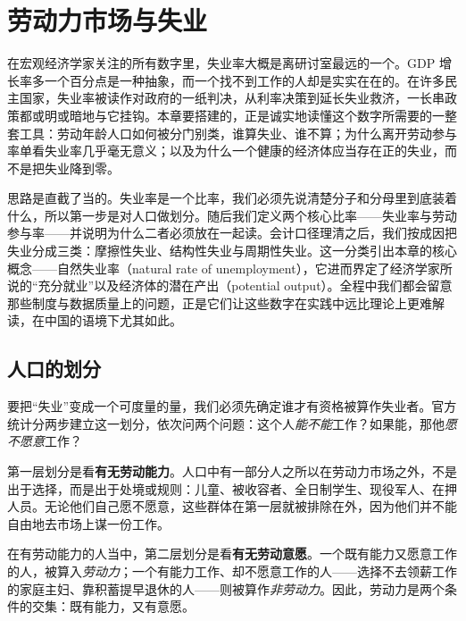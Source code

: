 \chapter{劳动力市场与失业}
\label{ch:labor}

在宏观经济学家关注的所有数字里，失业率大概是离研讨室最远的一个。GDP 增长率多一个百分点是一种抽象，而一个找不到工作的人却是实实在在的。在许多民主国家，失业率被读作对政府的一纸判决，从利率决策到延长失业救济，一长串政策都或明或暗地与它挂钩。本章要搭建的，正是诚实地读懂这个数字所需要的一整套工具：劳动年龄人口如何被分门别类，谁算失业、谁不算；为什么离开劳动参与率单看失业率几乎毫无意义；以及为什么一个健康的经济体应当存在正的失业，而不是把失业降到零。

思路是直截了当的。失业率是一个比率，我们必须先说清楚分子和分母里到底装着什么，所以第一步是对人口做划分。随后我们定义两个核心比率——失业率与劳动参与率——并说明为什么二者必须放在一起读。会计口径理清之后，我们按成因把失业分成三类：摩擦性失业、结构性失业与周期性失业。这一分类引出本章的核心概念——自然失业率（natural rate of unemployment），它进而界定了经济学家所说的“充分就业”以及经济体的潜在产出（potential output）。全程中我们都会留意那些制度与数据质量上的问题，正是它们让这些数字在实践中远比理论上更难解读，在中国的语境下尤其如此。

\section{人口的划分}

要把“失业”变成一个可度量的量，我们必须先确定谁才有资格被算作失业者。官方统计分两步建立这一划分，依次问两个问题：这个人\emph{能不能}工作？如果能，那他\emph{愿不愿意}工作？

第一层划分是看\textbf{有无劳动能力}。人口中有一部分人之所以在劳动力市场之外，不是出于选择，而是出于处境或规则：儿童、被收容者、全日制学生、现役军人、在押人员。无论他们自己愿不愿意，这些群体在第一层就被排除在外，因为他们并不能自由地去市场上谋一份工作。

在有劳动能力的人当中，第二层划分是看\textbf{有无劳动意愿}。一个既有能力又愿意工作的人，被算入\emph{劳动力}；一个有能力工作、却不愿意工作的人——选择不去领薪工作的家庭主妇、靠积蓄提早退休的人——则被算作\emph{非劳动力}。因此，劳动力是两个条件的交集：既有能力，又有意愿。


